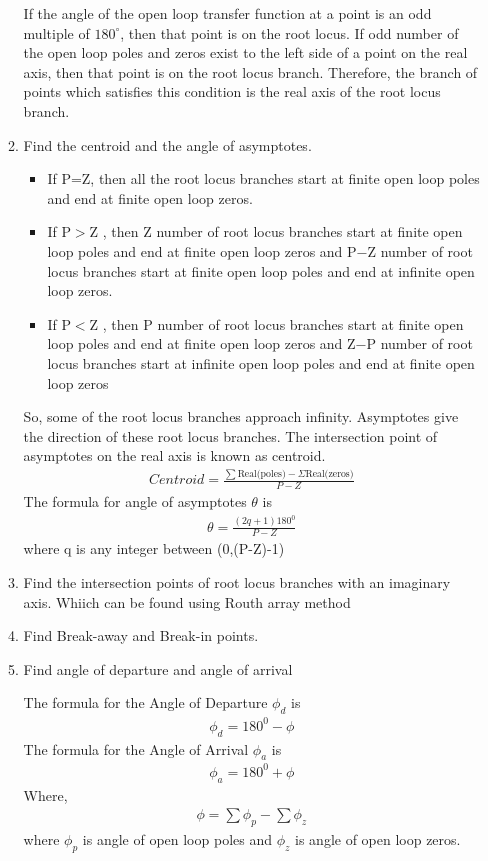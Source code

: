 \begin{enumerate}[label=\thesection.\arabic*.,ref=\thesection.\theenumi]
\begin{enumerate}
 If the angle of the open loop transfer function at a point is an odd multiple of $180^{\circ}$, then that point is on the root locus. If odd number of the open loop poles and zeros exist to the left side of a point on the real axis, then that point is on the root locus branch. Therefore, the branch of points which satisfies this condition is the real axis of the root locus branch.
	\item Find the centroid and the angle of asymptotes.
	\begin{itemize}
	\item If P=Z, then all the root locus branches start at finite open loop poles and end at finite open loop zeros.
	\item If P$>$Z , then Z number of root locus branches start at finite open loop poles and end at finite open loop zeros and P−Z number of root locus branches start at finite open loop poles and end at infinite open loop zeros.
	\item If P$<$Z , then P number of root locus branches start at finite open loop poles and end at finite open loop zeros and Z−P number of root locus branches start at infinite open loop poles and end at finite open loop zeros

	\end{itemize}
So, some of the root locus branches approach infinity. Asymptotes give the direction of these root locus branches. The intersection point of asymptotes on the real axis is known as centroid.
\begin{align}
Centroid =\frac{\sum \text {Real(poles)}-\Sigma \text {Real(zeros)}}{P-Z}
\end{align}
The formula for angle of asymptotes $\theta$ is
\begin{align}
\theta=\frac{(2 q+1) 180^{0}}{P-Z}
\end{align}
where q is any integer between (0,(P-Z)-1)


	\item Find the intersection points of root locus branches with an imaginary axis. Whiich can be found using Routh array method
	\item Find Break-away and Break-in points.
	\item Find angle of departure and angle of arrival

The formula for the Angle of Departure $\phi_{d}$ is
\begin{align}
\phi_{d}=180^{0}-\phi
\end{align}
The formula for the Angle of Arrival $\phi_{a}$ is
\begin{align}
\phi_{a}=180^{0}+\phi
\end{align}
Where,
\begin{align}
\phi=\sum \phi_{p}-\sum \phi_{z}
\end{align}
where $\phi_{p}$ is angle of open loop poles and $\phi_{z}$ is angle of open loop zeros.
     \end{enumerate}
    

\end{enumerate}

